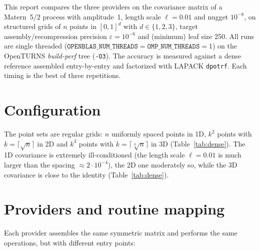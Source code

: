 \documentclass[11pt]{article}
\newcommand{\ot}{OpenTURNS}
\begin{document}
This report compares the three providers on the covariance matrix of a Matern~5/2
process with amplitude~1, length scale $\ell = 0.01$ and nugget $10^{-8}$, on
structured grids of $n$ points in $[0,1]^d$ with $d \in \{1,2,3\}$, target
assembly/recompression precision $\varepsilon = 10^{-6}$ and (minimum) leaf size
250.  All runs are single threaded
($\texttt{OPENBLAS\_NUM\_THREADS}=\texttt{OMP\_NUM\_THREADS}=1$) on the \ot{}
\emph{build-perf} tree (\texttt{-O3}).  The accuracy is measured against a dense
reference assembled entry-by-entry and factorized with LAPACK
\texttt{dpotrf}.  Each timing is the best of three repetitions.

\section{Configuration}\label{sec:config}

The point sets are regular grids: $n$ uniformly spaced points in 1D, $k^2$ points
with $k=\lceil\sqrt n\rceil$ in 2D and $k^3$ points with $k=\lceil\sqrt[3]{n}\rceil$
in 3D (Table~\ref{tab:dense}).  The 1D covariance is extremely ill-conditioned
(the length scale $\ell=0.01$ is much larger than the spacing $\approx 2\cdot
10^{-4}$), the 2D one moderately so, while the 3D covariance is close to the
identity (Table~\ref{tab:dense}).

\begin{table}[h]
  \centering
  \caption{Grids and dense reference values (Matern~5/2, $\ell=0.01$, variance~1,
           nugget $10^{-8}$).  $\log\det A$ and $\lambda_1$ are the dense values;
           ``dense KL'' is the wall-clock time of the Lanczos reference on the
           dense matrix.}
  \label{tab:dense}
  \tabdense
\end{table}

\section{Providers and routine mapping}\label{sec:providers}

Each provider assembles the same symmetric matrix and performs the same
operations, but with different entry points:
\end{document}
